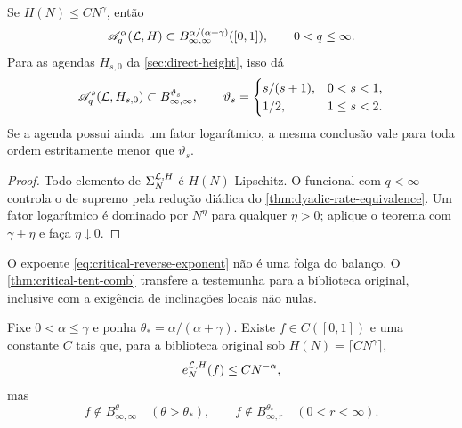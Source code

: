 \begin{corollary}
\label{cor:raw-library-inverse}
Se $H(N)\le C N^\gamma$, então
\begin{equation}
 \mathscr A_q^\alpha(\mathcal{L},H)
 \subset B^{\alpha/(\alpha+\gamma)}_{\infty,\infty}([0,1]),
 \qquad 0<q\le\infty.
 \label{eq:raw-library-inverse}
\end{equation}
Para as agendas $H_{s,0}$ da \cref{sec:direct-height}, isso dá
\begin{equation}
 \mathscr A_q^s(\mathcal{L},H_{s,0})
 \subset B^{\vartheta_s}_{\infty,\infty},
 \qquad
 \vartheta_s=
 \begin{cases}
 s/(s+1),&0<s<1,\\
 1/2,&1\le s<2.
 \end{cases}
 \label{eq:corrected-schedule-raw-inverse}
\end{equation}
Se a agenda possui ainda um fator logarítmico, a mesma conclusão vale para
toda ordem estritamente menor que $\vartheta_s$.
\end{corollary}

\begin{proof}
Todo elemento de $\Sigma_N^{\mathcal{L},H}$ é $H(N)$-Lipschitz. O funcional com
$q<\infty$ controla o de supremo pela redução diádica do
\cref{thm:dyadic-rate-equivalence}. Um fator logarítmico é dominado por
$N^\eta$ para qualquer $\eta>0$; aplique o teorema com
$\gamma+\eta$ e faça $\eta\downarrow0$.
\end{proof}

O expoente \eqref{eq:critical-reverse-exponent} não é uma folga do balanço.
O \cref{thm:critical-tent-comb} transfere a testemunha para a biblioteca
original, inclusive com a exigência de inclinações locais não nulas.

\begin{theorem}
\label{thm:critical-tent-comb}
Fixe $0<\alpha\le\gamma$ e ponha
$\theta_*=\alpha/(\alpha+\gamma)$. Existe
$f\in C([0,1])$ e uma constante $C$ tais que, para a biblioteca original sob
$H(N)=\lceil CN^\gamma\rceil$,
\begin{equation}
 e_N^{\mathcal{L},H}(f)\le CN^{-\alpha},
 \label{eq:comb-approximation-rate}
\end{equation}
mas
\begin{equation}
 f\notin B^\theta_{\infty,\infty}\quad(\theta>\theta_*),
 \qquad
 f\notin B^{\theta_*}_{\infty,r}\quad(0<r<\infty).
 \label{eq:comb-sharpness}
\end{equation}
\end{theorem}

